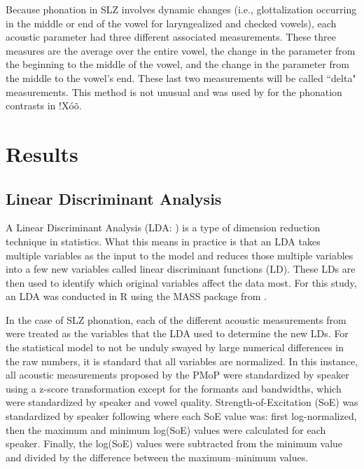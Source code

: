 \documentclass[12pt, letterpaper]{article}
\begin{document}
Because phonation in SLZ involves dynamic changes (i.e., glottalization occurring in the middle or end of the vowel for laryngealized and checked vowels), each acoustic parameter had three different associated measurements. These three measures are the average over the entire vowel, the change in the parameter from the beginning to the middle of the vowel, and the change in the parameter from the middle to the vowel’s end. These last two measurements will be called ``delta" measurements. This method is not unusual and was used by \citet{garellekAcousticDiscriminabilityComplex2020} for the phonation contrasts in !Xóõ.  

\section{Results} \label{sec:Results}

\subsection{Linear Discriminant Analysis} \label{sec:LDAResults}

A Linear Discriminant Analysis (LDA: \cite{fisherUseMultipleMeasurements1936}) is a type of dimension reduction technique in statistics. What this means in practice is that an LDA takes multiple variables as the input to the model and reduces those multiple variables into a few new variables called linear discriminant functions (LD). These LDs are then used to identify which original variables affect the data most. For this study, an LDA was conducted in R \citep{rcoreteamLanguageEnvironmentStatistical2021} using the MASS package from \citet{venablesModernAppliedStatistics2002}.

In the case of SLZ phonation, each of the different acoustic measurements from  were treated as the variables that the LDA used to determine the new LDs. For the statistical model to not be unduly swayed by large numerical differences in the raw numbers, it is standard that all variables are normalized. In this instance, all acoustic measurements proposed by the PMoP were standardized by speaker using a z-score transformation except for the formants and bandwidths, which were standardized by speaker and vowel quality. Strength-of-Excitation (SoE) was standardized by speaker following \citet{garellekVoicingGlottalConsonants2021} where each SoE value was: first log-normalized, then the maximum and minimum log(SoE) values were calculated for each speaker. Finally, the log(SoE) values were subtracted from the minimum value and divided by the difference between the maximum–minimum values.
\end{document}
